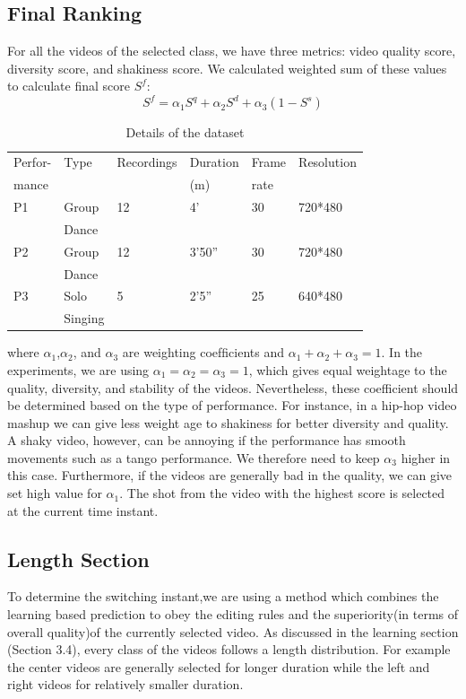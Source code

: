 \documentclass{sig-alternate}
\begin{document}
\subsection{Final Ranking}
For all the videos of the selected class, we have three metrics: video quality score, diversity score, and shakiness score. We calculated weighted sum of these values to calculate ﬁnal score \(S^f\):
\begin{equation}
 S^f = \alpha_1S^q + \alpha_2S^d + \alpha_3(1 - S^s)
\end{equation}

\begin{table}
\centering
\caption{ Details of the dataset }
\begin{tabular}{p{1cm}|p{1cm}|p{1.5cm}|p{1cm}|p{1cm}|p{1cm}} \hline
Perfor-&Type &Recordings &Duration&Frame&Resolution \\ 
mance & & & (m)&rate& \\ \hline
P1 &Group&12 &4' &30 &720*480\\
&Dance&&&&\\ \hline
P2 &Group&12 &3'50'' &30& 720*480\\
&Dance&&&&\\ \hline
P3& Solo&5 &2'5'' &25 &640*480\\
&Singing&&&&\\ \hline

\end{tabular}
\end{table}

where \(\alpha_1\),\(\alpha_2\), and \(\alpha_3\) are weighting coefﬁcients and \(\alpha_1 + \alpha_2 + \alpha_3 =1\). In the experiments, we are using \(\alpha_1 = \alpha_2 = \alpha_3 =1\),
which gives equal weightage to the quality, diversity, and stability of the videos. Nevertheless, these coefficient should be determined based on the type of performance. For instance, in a hip-hop video mashup we can give less weight age to shakiness for better diversity and quality. A shaky video, however, can be annoying if the performance has smooth movements such as a tango performance. We therefore need to keep \(\alpha_3\) higher in this case. Furthermore, if the videos are generally bad in the quality, we can give set high value for \(\alpha_1\). The shot from the video with the highest score is selected at the current time instant. 
\subsection{Length Section}
To determine the switching instant,we are using a method which combines the learning based prediction to obey the editing rules and the superiority(in terms of overall quality)of the currently selected video. As discussed in the learning section (Section 3.4), every class of the videos follows a length distribution. For example the center videos are generally selected for longer duration while the left and right videos for relatively smaller duration. 
\end{document}
